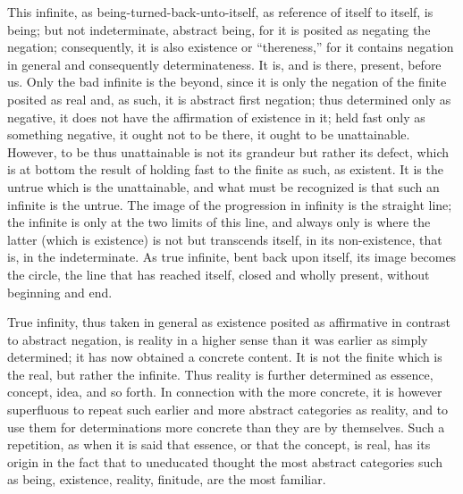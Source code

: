 This infinite, as being-turned-back-unto-itself,
as reference of itself to itself, is being;
but not indeterminate, abstract being,
for it is posited as negating the negation;
consequently, it is also existence or “thereness,”
for it contains negation in general
and consequently determinateness.
It is, and is there, present, before us.
Only the bad infinite is the beyond,
since it is only the negation of
the finite posited as real
and, as such, it is abstract first negation;
thus determined only as negative,
it does not have the affirmation of existence in it;
held fast only as something negative,
it ought not to be there, it ought to be unattainable.
However, to be thus unattainable is
not its grandeur but rather its defect,
which is at bottom the result of holding fast
to the finite as such, as existent.
It is the untrue which is the unattainable,
and what must be recognized is that
such an infinite is the untrue.
The image of the progression in infinity is the straight line;
the infinite is only at the two limits of this line,
and always only is where the latter
(which is existence)
is not but transcends itself,
in its non-existence, that is, in the indeterminate.
As true infinite, bent back upon itself,
its image becomes the circle,
the line that has reached itself,
closed and wholly present,
without beginning and end.

True infinity, thus taken in general as existence posited
as affirmative in contrast to abstract negation,
is reality in a higher sense than it was earlier
as simply determined; it has now obtained a concrete content.
It is not the finite which is the real, but rather the infinite.
Thus reality is further determined
as essence, concept, idea, and so forth.
In connection with the more concrete,
it is however superfluous to repeat such earlier
and more abstract categories as reality,
and to use them for determinations more
concrete than they are by themselves.
Such a repetition, as when it is said that essence,
or that the concept, is real, has its origin in the fact
that to uneducated thought the most abstract categories
such as being, existence, reality, finitude, are the most familiar.

